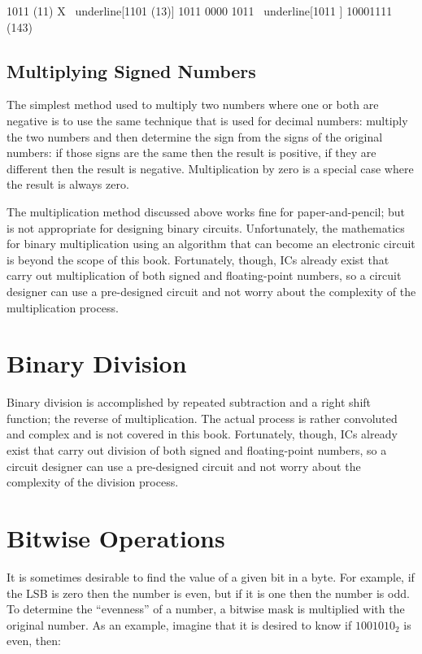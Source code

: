 \begin{binDisp}[commandchars=~\[\]]
        1011  (11)
      X ~underline[1101  (13)]
        1011
       0000
      1011
     ~underline[1011          ]
    10001111  (143)
\end{binDisp}

\subsection{Multiplying Signed Numbers}
\label{MO:sub:multiplying_signed_numbers}

The simplest method used to multiply two numbers where one or both are negative is to use the same technique that is used for decimal numbers: multiply the two numbers and then determine the sign from the signs of the original numbers: if those signs are the same then the result is positive, if they are different then the result is negative. Multiplication by zero is a special case where the result is always zero.

The multiplication method discussed above works fine for paper-and-pencil; but is not appropriate for designing binary circuits. Unfortunately, the mathematics for binary multiplication using an algorithm that can become an electronic circuit is beyond the scope of this book. Fortunately, though, \acp{IC} already exist that carry out multiplication of both signed and floating-point numbers, so a circuit designer can use a pre-designed circuit and not worry about the complexity of the multiplication process.

\section{Binary Division}
\label{MO:sec:binary_division}

Binary division is accomplished by repeated subtraction and a right shift function; the reverse of multiplication. The actual process is rather convoluted and complex and is not covered in this book. Fortunately, though, \acp{IC} already exist that carry out division of both signed and floating-point numbers, so a circuit designer can use a pre-designed circuit and not worry about the complexity of the division process.

\section{Bitwise Operations}
\label{MO:sec:bitwise_operations}

It is sometimes desirable to find the value of a given bit in a byte. For example, if the \ac{LSB} is zero then the number is even, but if it is one then the number is odd. To determine the ``evenness'' of a number, a bitwise mask is multiplied with the original number. As an example, imagine that it is desired to know if $ 1001010_2 $ is even, then:

